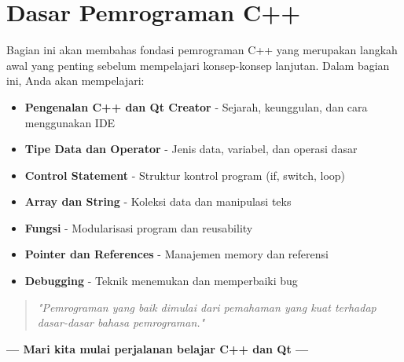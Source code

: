 \section*{Dasar Pemrograman C++}

Bagian ini akan membahas fondasi pemrograman C++ yang merupakan langkah awal yang penting sebelum mempelajari konsep-konsep lanjutan. Dalam bagian ini, Anda akan mempelajari:

\begin{itemize}
\item \textbf{Pengenalan C++ dan Qt Creator} - Sejarah, keunggulan, dan cara menggunakan IDE
\item \textbf{Tipe Data dan Operator} - Jenis data, variabel, dan operasi dasar
\item \textbf{Control Statement} - Struktur kontrol program (if, switch, loop)
\item \textbf{Array dan String} - Koleksi data dan manipulasi teks
\item \textbf{Fungsi} - Modularisasi program dan reusability
\item \textbf{Pointer dan References} - Manajemen memory dan referensi
\item \textbf{Debugging} - Teknik menemukan dan memperbaiki bug
\end{itemize}

\begin{quote}
\textit{"Pemrograman yang baik dimulai dari pemahaman yang kuat terhadap dasar-dasar bahasa pemrograman."}
\end{quote}

\vspace{1cm}

\begin{center}
\textbf{--- Mari kita mulai perjalanan belajar C++ dan Qt ---}
\end{center}
